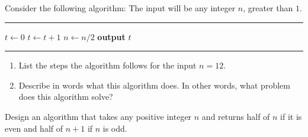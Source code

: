 \begin{exer}\label{exer:17.2}
Consider the following algorithm: The input will be any integer $n$,
greater than $1$.
\begin{algrthm}
  \hrule\kern5pt\relax
  \begin{algorithmic}
    \State $t \gets 0$
      \State $t \gets t+1$
      \State $n \gets n/2$
    \EndWhile
    \State \textbf{output} $t$
  \end{algorithmic}
  \hrule\kern5pt\relax
\end{algrthm}

%
%
%

\begin{enumerate}[label=(\alph*)]
 \item List the steps the algorithm follows for the input $n=12$.
 
 \item Describe in words what this algorithm does. In other words,
 what problem does this algorithm solve?
\end{enumerate}
\end{exer}

\begin{exer}
Design an algorithm that takes any positive integer $n$ and returns half of $n$ if it is even and
half of $n+1$ if $n$ is odd.
\end{exer}


